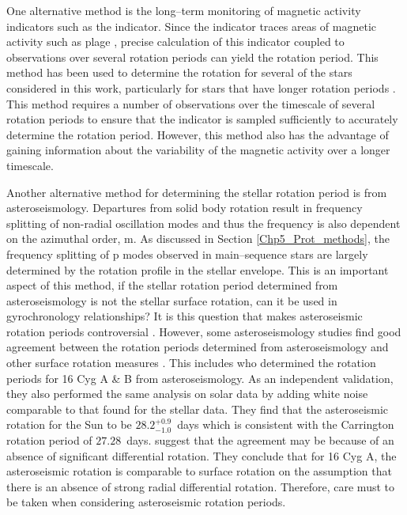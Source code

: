 One alternative method is the long--term monitoring of magnetic activity indicators such as the \Rprime indicator. Since the \Rprime indicator traces areas of magnetic activity such as plage \citep{Leighton_1959}, precise calculation of this indicator coupled to observations over several rotation periods can yield the rotation period. This method has been used to determine the rotation for several of the stars considered in this work, particularly for stars that have longer rotation periods \citep{Boro_Saikia_etal_2016,Vaughan_etal_1981,Robertson_etal_2015_GJ191}. This method requires a number of observations over the timescale of several rotation periods to ensure that the \Rprime indicator is sampled sufficiently to accurately determine the rotation period. However, this method also has the advantage of gaining information about the variability of the magnetic activity over a longer timescale.

Another alternative method for determining the stellar rotation period is from asteroseismology. Departures from solid body rotation result in frequency splitting of non-radial oscillation modes and thus the frequency is also dependent on the azimuthal order, m. As discussed in Section \ref{Chp5_Prot_methods}, the frequency splitting of p modes observed in main--sequence stars are largely determined by the rotation profile in the stellar envelope. This is an important aspect of this method, if the stellar rotation period determined from asteroseismology is not the stellar surface rotation, can it be used in gyrochronology relationships? It is this question that makes asteroseismic rotation periods controversial \citep{Barnes_etal_2016_aspect_gyro}. However, some asteroseismology studies find good agreement between the rotation periods determined from asteroseismology and other surface rotation measures \citep{Chaplin_etal_2013,Gizon_etal_2013}. This includes \citet{Davies_etal_2015} who determined the rotation periods for 16 Cyg A \& B from asteroseismology. As an independent validation, they also performed the same analysis on solar data by adding white noise comparable to that found for the stellar data. They find that the asteroseismic rotation for the Sun to be $28.2^{+0.9}_{-1.0}$~days which is consistent with the Carrington rotation period of $27.28$~days. \citet{Davies_etal_2015} suggest that the agreement may be because of an absence of significant differential rotation. They conclude that for 16 Cyg A, the asteroseismic rotation is comparable to surface rotation on the assumption that there is an absence of strong radial differential rotation. Therefore, care must to be taken when considering asteroseismic rotation periods.

